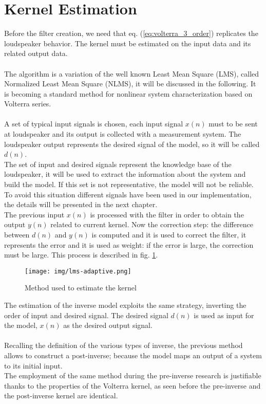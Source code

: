\section{Kernel Estimation}
Before the filter creation, we need that eq. (\ref{eq:volterra_3_order}) replicates the loudspeaker behavior. The kernel must be estimated on the input data and its related output data.\\\\ 
The algorithm is a variation of the well known Least Mean Square (LMS), called Normalized Least Mean Square (NLMS), it will be discussed in the following. It is becoming a standard method for nonlinear system characterization based on Volterra series.\\\\
A set of typical input signals is chosen, each input signal $x(n)$ must to be sent at loudspeaker and its output is collected with a measurement system. The loudspeaker output represents the desired signal of the model, so it will be called $d(n)$.\\
The set of input and desired signals represent the knowledge base of the loudspeaker, it will be used to extract the information about the system and build the model. If this set is not representative, the model will not be reliable. To avoid this situation different signals have been used in our implementation, the details will be presented in the next chapter.\\
The previous input $x(n)$ is processed with the filter in order to obtain the output $y(n)$ related to current kernel. Now the correction step: the difference between $d(n)$ and $y(n)$ is computed and it is used to correct the filter, it represents the error and it is used as weight: if the error is large, the correction must be large.
This process is described in fig. \ref{fig:lmsadaptive}. \\
\begin{figure}[h]\centering
\texttt{[image: img/lms-adaptive.png]} 
\caption{Method used to estimate the kernel} \label{fig:lmsadaptive}
\end{figure}
The estimation of the inverse model exploits the same strategy, inverting the order of input and desired signal. The desired signal $d(n)$ is used as input for the model,  $x(n)$ as the desired output signal.\\\\
Recalling the definition of the various types of inverse, the previous method allows to construct a post-inverse; because the model maps an output of a system to its initial input.\\
The employment of the same method during the pre-inverse research is justifiable thanks to the properties of the Volterra kernel, as seen before the pre-inverse and the post-inverse kernel are identical.
